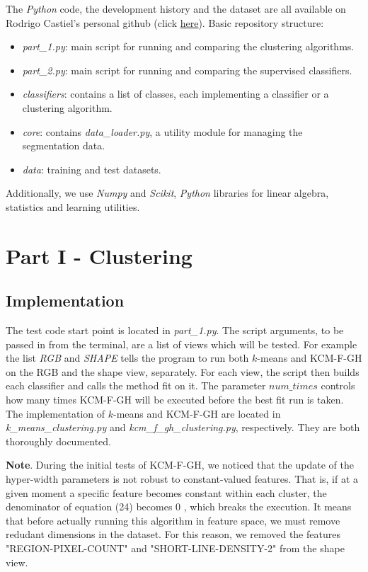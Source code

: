 \documentclass[conference]{IEEEtran}
\begin{document}
The \textit{Python} code, the development history and the dataset are all available on Rodrigo Castiel's personal github (click \href{https://github.com/RodrigoCastiel/am_f}{here}).
Basic repository structure:
\begin{itemize}
\item \textit{part\_1.py}: main script for running and comparing the clustering algorithms.
\item \textit{part\_2.py}: main script for running and comparing the supervised classifiers.
\item \textit{classifiers}: contains a list of classes, each implementing a classifier or a clustering algorithm.
\item \textit{core}: contains \textit{data\_loader.py}, a utility module for managing the segmentation data.
\item \textit{data}: training and test datasets.
\end{itemize}

Additionally, we use \textit{Numpy} and \textit{Scikit}, \textit{Python} libraries for linear algebra, statistics and learning utilities.

\section{Part I - Clustering}

\subsection{Implementation}

The test code start point is located in \textit{part\_1.py}.
The script arguments, to be passed in from the terminal, are a list of views which will be tested.
For example the list \textit{RGB} and \textit{SHAPE} tells the program to run both $k$-means and KCM-F-GH on the RGB and the shape view, separately.
For each view, the script then builds each classifier and calls the method fit on it.
The parameter $num\_times$ controls how many times KCM-F-GH will be executed before the best fit run is taken.
The implementation of $k$-means and KCM-F-GH are located in \textit{k\_means\_clustering.py} and \textit{kcm\_f\_gh\_clustering.py}, respectively.
They are both thoroughly documented.

\textbf{Note}. During the initial tests of KCM-F-GH, we noticed that the update of the hyper-width parameters is not robust to constant-valued features.
That is, if at a given moment a specific feature becomes constant within each cluster, the denominator of equation (24) becomes $0$ \cite{b1}, which breaks the execution.
It means that before actually running this algorithm in feature space, we must remove redudant dimensions in the dataset.
For this reason, we removed the features "REGION-PIXEL-COUNT" and "SHORT-LINE-DENSITY-2" from the shape view.
\end{document}

